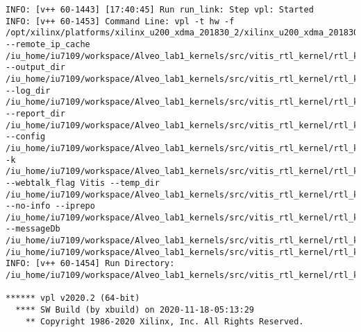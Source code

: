 \begin{center}
\begin{lstlisting}[label=lst:vlog,caption=Файл v++\_vinc.log]
INFO: [v++ 60-1443] [17:40:45] Run run_link: Step vpl: Started
INFO: [v++ 60-1453] Command Line: vpl -t hw -f /opt/xilinx/platforms/xilinx_u200_xdma_201830_2/xilinx_u200_xdma_201830_2.xpfm --remote_ip_cache /iu_home/iu7109/workspace/Alveo_lab1_kernels/src/vitis_rtl_kernel/rtl_kernel_wizard_2/.ipcache --output_dir /iu_home/iu7109/workspace/Alveo_lab1_kernels/src/vitis_rtl_kernel/rtl_kernel_wizard_2/_x/link/int --log_dir /iu_home/iu7109/workspace/Alveo_lab1_kernels/src/vitis_rtl_kernel/rtl_kernel_wizard_2/_x/logs/link --report_dir /iu_home/iu7109/workspace/Alveo_lab1_kernels/src/vitis_rtl_kernel/rtl_kernel_wizard_2/_x/reports/link --config /iu_home/iu7109/workspace/Alveo_lab1_kernels/src/vitis_rtl_kernel/rtl_kernel_wizard_2/_x/link/int/vplConfig.ini -k /iu_home/iu7109/workspace/Alveo_lab1_kernels/src/vitis_rtl_kernel/rtl_kernel_wizard_2/_x/link/int/kernel_info.dat --webtalk_flag Vitis --temp_dir /iu_home/iu7109/workspace/Alveo_lab1_kernels/src/vitis_rtl_kernel/rtl_kernel_wizard_2/_x/link --no-info --iprepo /iu_home/iu7109/workspace/Alveo_lab1_kernels/src/vitis_rtl_kernel/rtl_kernel_wizard_2/_x/link/int/xo/ip_repo/mycompany_com_kernel_rtl_kernel_wizard_2_1_0 --messageDb /iu_home/iu7109/workspace/Alveo_lab1_kernels/src/vitis_rtl_kernel/rtl_kernel_wizard_2/_x/link/run_link/vpl.pb /iu_home/iu7109/workspace/Alveo_lab1_kernels/src/vitis_rtl_kernel/rtl_kernel_wizard_2/_x/link/int/dr.bd.tcl
INFO: [v++ 60-1454] Run Directory: /iu_home/iu7109/workspace/Alveo_lab1_kernels/src/vitis_rtl_kernel/rtl_kernel_wizard_2/_x/link/run_link

****** vpl v2020.2 (64-bit)
  **** SW Build (by xbuild) on 2020-11-18-05:13:29
    ** Copyright 1986-2020 Xilinx, Inc. All Rights Reserved.


\end{lstlisting}
\end{center}
